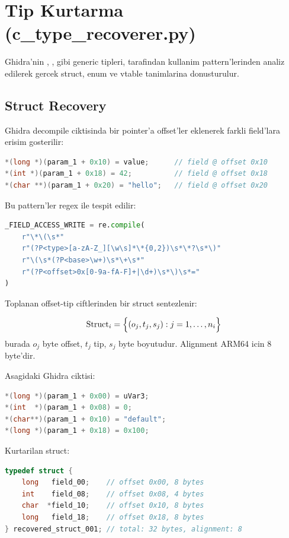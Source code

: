 \section{Tip Kurtarma (c\_type\_recoverer.py)}
\label{sec:type-recovery}

Ghidra'nin , ,  gibi generic
tipleri,  tarafindan kullanim pattern'lerinden
analiz edilerek gercek struct, enum ve vtable tanimlarina donusturulur.

\subsection{Struct Recovery}

Ghidra decompile ciktisinda bir pointer'a offset'ler eklenerek farkli
field'lara erisim gosterilir:
\begin{lstlisting}[language=C, caption={Ghidra decompile ciktisinda struct field erisim pattern'i}]
*(long *)(param_1 + 0x10) = value;      // field @ offset 0x10
*(int *)(param_1 + 0x18) = 42;          // field @ offset 0x18
*(char **)(param_1 + 0x20) = "hello";   // field @ offset 0x20
\end{lstlisting}

Bu pattern'ler regex ile tespit edilir:

\begin{lstlisting}[language=Python, caption={Field access regex pattern'leri (c\_type\_recoverer.py)}, label={lst:field-access-regex}]
_FIELD_ACCESS_WRITE = re.compile(
    r"\*\(\s*"
    r"(?P<type>[a-zA-Z_][\w\s]*\*{0,2})\s*\*?\s*\)"
    r"\(\s*(?P<base>\w+)\s*\+\s*"
    r"(?P<offset>0x[0-9a-fA-F]+|\d+)\s*\)\s*="
)
\end{lstlisting}

Toplanan offset-tip ciftlerinden bir struct sentezlenir:

\begin{equation}
  \text{Struct}_i = \Bigl\{ (o_j, t_j, s_j) : j = 1, \ldots, n_i \Bigr\}
  \label{eq:struct-synth}
\end{equation}
burada $o_j$ byte offset, $t_j$ tip, $s_j$ byte boyutudur.
Alignment ARM64 icin 8 byte'dir.

\begin{example}
Asagidaki Ghidra ciktisi:
\begin{lstlisting}[language=C]
*(long *)(param_1 + 0x00) = uVar3;
*(int  *)(param_1 + 0x08) = 0;
*(char**)(param_1 + 0x10) = "default";
*(long *)(param_1 + 0x18) = 0x100;
\end{lstlisting}
Kurtarilan struct:
\begin{lstlisting}[language=C]
typedef struct {
    long   field_00;    // offset 0x00, 8 bytes
    int    field_08;    // offset 0x08, 4 bytes
    char  *field_10;    // offset 0x10, 8 bytes
    long   field_18;    // offset 0x18, 8 bytes
} recovered_struct_001; // total: 32 bytes, alignment: 8
\end{lstlisting}
\end{example}

